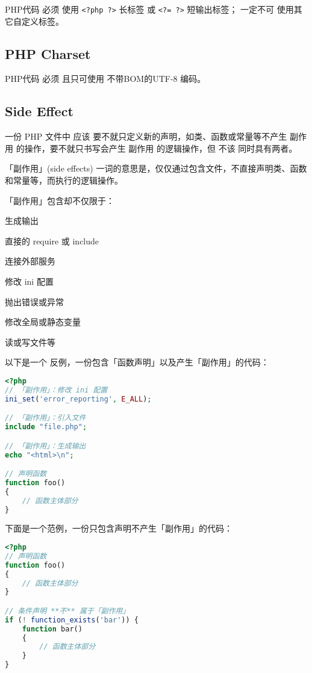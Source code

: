 PHP代码 必须 使用 \texttt{<?php ?>} 长标签 或 \texttt{<?= ?>} 短输出标签； 一定不可 使用其它自定义标签。

\subsection{PHP Charset}

PHP代码 必须 且只可使用 不带BOM的UTF-8 编码。


\subsection{Side Effect}

一份 PHP 文件中 应该 要不就只定义新的声明，如类、函数或常量等不产生 副作用 的操作，要不就只书写会产生 副作用 的逻辑操作，但 不该 同时具有两者。

「副作用」(side effects) 一词的意思是，仅仅通过包含文件，不直接声明类、函数和常量等，而执行的逻辑操作。

「副作用」包含却不仅限于：

\begin{compactitem}
\item 生成输出
\item 直接的 require 或 include
\item 连接外部服务
\item 修改 ini 配置
\item 抛出错误或异常
\item 修改全局或静态变量
\item 读或写文件等
\end{compactitem}

以下是一个 反例，一份包含「函数声明」以及产生「副作用」的代码：

\begin{lstlisting}[language=PHP]
<?php
// 「副作用」：修改 ini 配置
ini_set('error_reporting', E_ALL);

// 「副作用」：引入文件
include "file.php";

// 「副作用」：生成输出
echo "<html>\n";

// 声明函数
function foo()
{
    // 函数主体部分
}
\end{lstlisting}

下面是一个范例，一份只包含声明不产生「副作用」的代码：

\begin{lstlisting}[language=PHP]
<?php
// 声明函数
function foo()
{
    // 函数主体部分
}

// 条件声明 **不** 属于「副作用」
if (! function_exists('bar')) {
    function bar()
    {
        // 函数主体部分
    }
}
\end{lstlisting}


